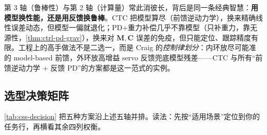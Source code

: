 \begin{insight}
第 3 轴（鲁棒性）与第 2 轴（计算量）常此消彼长，背后是同一条经典智慧：\textbf{用模型换性能，还是用反馈换鲁棒}。CTC 把模型算尽（前馈逆动力学），换来精确线性误差动态，但模型一偏就退化；PD+重力补偿几乎不靠模型（只补重力，靠无源性，\cref{thm:ctrl-pd-grav}），换来对 $\mathbf{M},\mathbf{C}$ 误差的免疫，但只能定位、跟踪精度有限。工程上的高手做法不是二选一，而是 Craig 的\emph{控制律划分}：内环放尽可能准的 model-based 前馈，外环放高增益 servo 反馈兜底模型残差——CTC 与所有“前馈逆动力学 + 反馈 PD”的方案都是这一范式的实例。
\end{insight}

\subsection{选型决策矩阵}
\label{sec:css-matrix}
\cref{tab:css-decision} 把五种方案沿上述五轴并排。读法：先按“适用场景”定位到你的任务行，再横看其余四列权衡。

